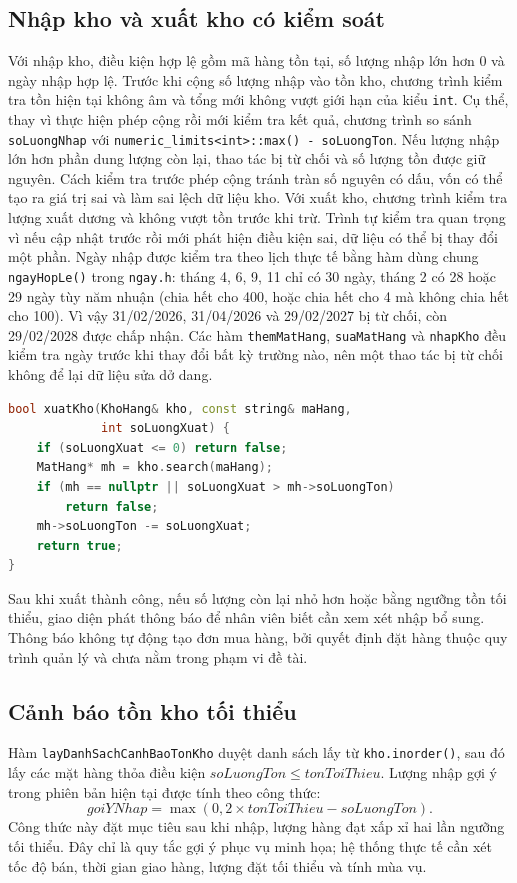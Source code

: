 \subsection{Nhập kho và xuất kho có kiểm soát}
Với nhập kho, điều kiện hợp lệ gồm mã hàng tồn tại, số lượng nhập lớn hơn 0 và ngày nhập hợp lệ. Trước khi cộng số lượng nhập vào tồn kho, chương trình kiểm tra tồn hiện tại không âm và tổng mới không vượt giới hạn của kiểu \texttt{int}. Cụ thể, thay vì thực hiện phép cộng rồi mới kiểm tra kết quả, chương trình so sánh \texttt{soLuongNhap} với \texttt{numeric\_limits<int>::max() - soLuongTon}. Nếu lượng nhập lớn hơn phần dung lượng còn lại, thao tác bị từ chối và số lượng tồn được giữ nguyên. Cách kiểm tra trước phép cộng tránh tràn số nguyên có dấu, vốn có thể tạo ra giá trị sai và làm sai lệch dữ liệu kho. Với xuất kho, chương trình kiểm tra lượng xuất dương và không vượt tồn trước khi trừ. Trình tự kiểm tra quan trọng vì nếu cập nhật trước rồi mới phát hiện điều kiện sai, dữ liệu có thể bị thay đổi một phần. Ngày nhập được kiểm tra theo lịch thực tế bằng hàm dùng chung \texttt{ngayHopLe()} trong \texttt{ngay.h}: tháng 4, 6, 9, 11 chỉ có 30 ngày, tháng 2 có 28 hoặc 29 ngày tùy năm nhuận (chia hết cho 400, hoặc chia hết cho 4 mà không chia hết cho 100). Vì vậy 31/02/2026, 31/04/2026 và 29/02/2027 bị từ chối, còn 29/02/2028 được chấp nhận. Các hàm \texttt{themMatHang}, \texttt{suaMatHang} và \texttt{nhapKho} đều kiểm tra ngày trước khi thay đổi bất kỳ trường nào, nên một thao tác bị từ chối không để lại dữ liệu sửa dở dang.
\begin{lstlisting}[language=C++,caption={Đoạn kiểm tra xuất kho, trích theo logic module}]
bool xuatKho(KhoHang& kho, const string& maHang,
             int soLuongXuat) {
    if (soLuongXuat <= 0) return false;
    MatHang* mh = kho.search(maHang);
    if (mh == nullptr || soLuongXuat > mh->soLuongTon)
        return false;
    mh->soLuongTon -= soLuongXuat;
    return true;
}
\end{lstlisting}
Sau khi xuất thành công, nếu số lượng còn lại nhỏ hơn hoặc bằng ngưỡng tồn tối thiểu, giao diện phát thông báo để nhân viên biết cần xem xét nhập bổ sung. Thông báo không tự động tạo đơn mua hàng, bởi quyết định đặt hàng thuộc quy trình quản lý và chưa nằm trong phạm vi đề tài.

\subsection{Cảnh báo tồn kho tối thiểu}
Hàm \texttt{layDanhSachCanhBaoTonKho} duyệt danh sách lấy từ \texttt{kho.inorder()}, sau đó lấy các mặt hàng thỏa điều kiện $soLuongTon \le tonToiThieu$. Lượng nhập gợi ý trong phiên bản hiện tại được tính theo công thức:
\[
  goiYNhap = \max(0, 2\times tonToiThieu - soLuongTon).
\]
Công thức này đặt mục tiêu sau khi nhập, lượng hàng đạt xấp xỉ hai lần ngưỡng tối thiểu. Đây chỉ là quy tắc gợi ý phục vụ minh họa; hệ thống thực tế cần xét tốc độ bán, thời gian giao hàng, lượng đặt tối thiểu và tính mùa vụ.

